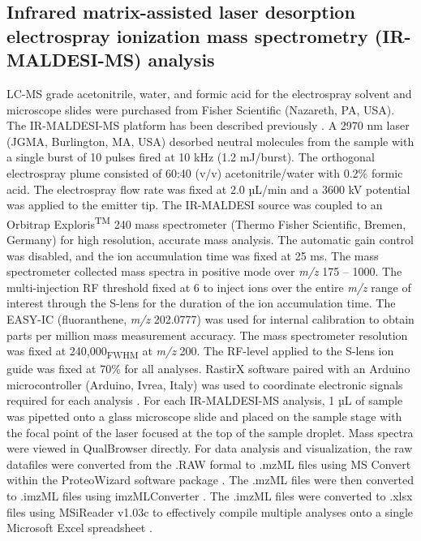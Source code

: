 \documentclass[9pt,twocolumn,twoside,lineno]{biorxiv}
\begin{document}
\subsection{Infrared matrix-assisted laser desorption electrospray ionization mass spectrometry (IR-MALDESI-MS) analysis}
LC-MS grade acetonitrile, water, and formic acid for the electrospray solvent and microscope slides were purchased from Fisher Scientific (Nazareth, PA, USA). 
The IR-MALDESI-MS platform has been described previously \cite{Caleb_Bagley2021-eh, Bokhart2016-he}. 
A 2970 nm laser (JGMA, Burlington, MA, USA) desorbed neutral molecules from the sample with a single burst of 10 pulses fired at 10 kHz (1.2 mJ/burst). 
The orthogonal electrospray plume consisted of 60:40 (v/v) acetonitrile/water with 0.2\% formic acid. 
The electrospray flow rate was fixed at 2.0 µL/min and a 3600 kV potential was applied to the emitter tip. 
 The IR-MALDESI source was coupled to an Orbitrap Exploris\textsuperscript{TM} 240 mass spectrometer (Thermo Fisher Scientific, Bremen, Germany) for high resolution, accurate mass analysis. 
The automatic gain control was disabled, and the ion accumulation time was fixed at 25 ms. 
The mass spectrometer collected mass spectra in positive mode over \textit{m/z} 175 – 1000. 
The multi-injection RF threshold fixed at 6 to inject ions over the entire \textit{m/z} range of interest through the S-lens for the duration of the ion accumulation time. 
The EASY-IC (fluoranthene, \textit{m/z} 202.0777) was used for internal calibration to obtain parts per million mass measurement accuracy. 
The mass spectrometer resolution was fixed at 240,000\textsubscript{FWHM} at \textit{m/z} 200. The RF-level applied to the S-lens ion guide was fixed at 70\% for all analyses. 
RastirX software paired with an Arduino microcontroller (Arduino, Ivrea, Italy) was used to coordinate electronic signals required for each analysis \cite{Garrard2020-nt}. 
For each IR-MALDESI-MS analysis, 1 µL of sample was pipetted onto a glass microscope slide and placed on the sample stage with the focal point of the laser focused at the top of the sample droplet.
Mass spectra were viewed in QualBrowser directly. 
For data analysis and visualization, the raw datafiles were converted from the .RAW formal to .mzML files using MS Convert within the ProteoWizard software package \cite{Chambers2012-da}. 
The .mzML files were then converted to .imzML files using imzMLConverter \cite{Race2012-wl}. 
The .imzML files were converted to .xlsx files using MSiReader v1.03c to effectively compile multiple analyses onto a single Microsoft Excel spreadsheet \cite{Robichaud2013-ao, Bokhart2018-hs}.
\end{document}
